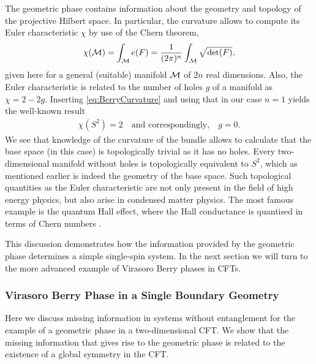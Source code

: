 \documentclass[a4paper,11pt]{article}
\newcommand{\1}{\mathds{1}}
\begin{document}
The geometric phase contains information about the geometry and topology of the projective Hilbert space. In particular, the curvature allows to compute its Euler characteristic $\chi$ by use of the Chern theorem,
\begin{align}
    \chi({\cal M})=\int_{\cal M}e(F)=\frac{1}{(2\pi)^n}\int_{\cal M}\sqrt{\det(F)},
\end{align}
given here for a general (suitable) manifold ${\cal M}$ of $2n$ real dimensions. Also, the Euler characteristic is related to the number of holes $g$ of a manifold as $\chi=2-2g$. Inserting \eqref{eq:BerryCurvature} and using that in our case $n=1$ yields the well-known result
\begin{align}
    \chi(S^2)=2\quad\text{and correspondingly,}\quad g=0.
\end{align}
We see that knowledge of the curvature of the bundle allows to calculate that the base space (in this case) is topologically trivial as it has no holes. Every two-dimensional manifold without holes is topologically equivalent to $S^2$, which as mentioned earlier is indeed the geometry of the base space. Such topological quantities as the Euler characteristic are not only present in the field of high energy physics, but also arise in condensed matter physics. The most famous example is the quantum Hall effect, where the Hall conductance is quantised in terms of Chern numbers \cite{Thouless1982quantized,Hastings2015quantization}.

This discussion demonstrates how the information provided by the geometric phase determines a simple single-spin system. In the next section we will turn to the  more advanced example of Virasoro Berry phases in  CFTs.

\subsubsection{Virasoro Berry Phase in a Single Boundary Geometry}
\label{sec:Virasoro Berry phase}

Here we discuss missing information in systems without entanglement for the example of a geometric phase in a two-dimensional CFT. We show that the missing information that gives rise to the geometric phase is related to the existence of a global symmetry in the CFT.
\end{document}
